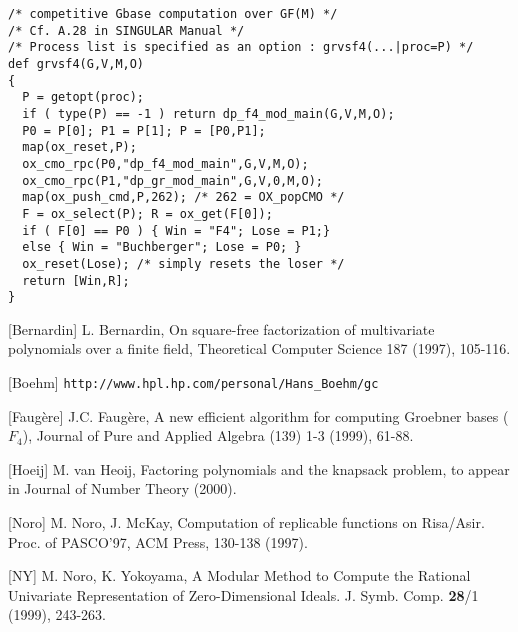 \begin{slide}{}

\begin{verbatim}
/* competitive Gbase computation over GF(M) */
/* Cf. A.28 in SINGULAR Manual */
/* Process list is specified as an option : grvsf4(...|proc=P) */
def grvsf4(G,V,M,O)
{
  P = getopt(proc);
  if ( type(P) == -1 ) return dp_f4_mod_main(G,V,M,O);
  P0 = P[0]; P1 = P[1]; P = [P0,P1];
  map(ox_reset,P);
  ox_cmo_rpc(P0,"dp_f4_mod_main",G,V,M,O);
  ox_cmo_rpc(P1,"dp_gr_mod_main",G,V,0,M,O);
  map(ox_push_cmd,P,262); /* 262 = OX_popCMO */
  F = ox_select(P); R = ox_get(F[0]);
  if ( F[0] == P0 ) { Win = "F4"; Lose = P1;}
  else { Win = "Buchberger"; Lose = P0; }
  ox_reset(Lose); /* simply resets the loser */
  return [Win,R];
}
\end{verbatim}
\end{slide}

\begin{slide}{}

[Bernardin] L. Bernardin, On square-free factorization of 
multivariate polynomials over a finite field, Theoretical
Computer Science 187 (1997), 105-116.

[Boehm] {\tt http://www.hpl.hp.com/personal/Hans\_Boehm/gc}

[Faug\`ere] J.C. Faug\`ere,
A new efficient algorithm for computing Groebner bases  ($F_4$),
Journal of Pure and Applied Algebra (139) 1-3 (1999), 61-88.

[Hoeij] M. van Heoij, Factoring polynomials and the knapsack problem,
to appear in Journal of Number Theory (2000).

[Noro] M. Noro, J. McKay,
Computation of replicable functions on Risa/Asir.
Proc. of PASCO'97, ACM Press, 130-138 (1997).

[NY] M. Noro, K. Yokoyama, 
A Modular Method to Compute the Rational Univariate
Representation of Zero-Dimensional Ideals.
J. Symb. Comp. {\bf 28}/1 (1999), 243-263.
\end{slide}

